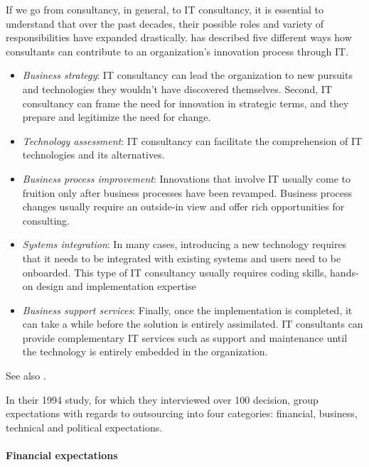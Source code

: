 \documentclass[12pt]{article}
\providecommand{\tightlist}{%
  \setlength{\itemsep}{0pt}\setlength{\parskip}{0pt}}
\begin{document}
If we go from consultancy, in general, to IT consultancy, it is
essential to understand that over the past decades, their possible roles
and variety of responsibilities have expanded drastically.
\citet[20-25]{swanson2010} has described five different ways how
consultants can contribute to an organization's innovation process
through IT.

\begin{itemize}
\tightlist
\item
  \emph{Business strategy}: IT consultancy can lead the organization to
  new pursuits and technologies they wouldn't have discovered
  themselves. Second, IT consultancy can frame the need for innovation
  in strategic terms, and they prepare and legitimize the need for
  change.
\item
  \emph{Technology assessment}: IT consultancy can facilitate the
  comprehension of IT technologies and its alternatives.
\item
  \emph{Business process improvement}: Innovations that involve IT
  usually come to fruition only after business processes have been
  revamped. Business process changes usually require an outside-in view
  and offer rich opportunities for consulting.
\item
  \emph{Systems integration}: In many cases, introducing a new
  technology requires that it needs to be integrated with existing
  systems and users need to be onboarded. This type of IT consultancy
  usually requires coding skills, hands-on design and implementation
  expertise
\item
  \emph{Business support services}: Finally, once the implementation is
  completed, it can take a while before the solution is entirely
  assimilated. IT consultants can provide complementary IT services such
  as support and maintenance until the technology is entirely embedded
  in the organization.
\end{itemize}

See also \citep{bessant1995}.

In their 1994 study, for which they interviewed over 100 decision,
\citet[10-17]{lacity1994} group expectations with regards to outsourcing
into four categories: financial, business, technical and political
expectations.

\hypertarget{financial-expectations}{%
\paragraph{Financial expectations}\label{financial-expectations}}
\end{document}
